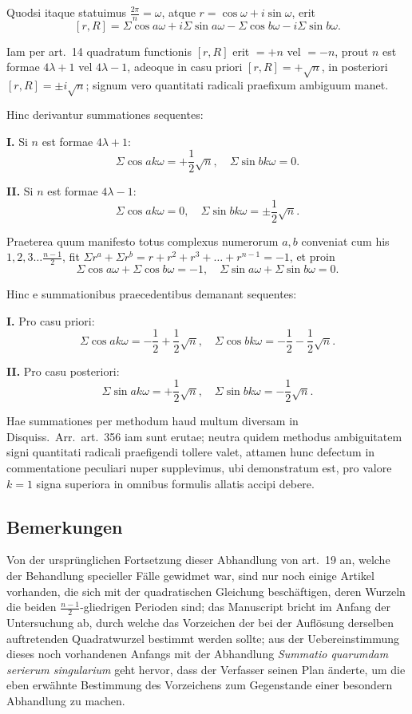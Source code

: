 \documentclass[12pt,a4paper]{article}
\begin{document}
Quodsi itaque statuimus $\frac{2\pi}{n} = \omega$, atque $r = \cos\omega + i\sin\omega$, erit
\[
[r,R] = \Sigma\cos a\omega + i\Sigma\sin a\omega - \Sigma\cos b\omega - i\Sigma\sin b\omega.
\]

Iam per art.\ 14 quadratum functionis $[r,R]$ erit $=+n$ vel $=-n$, prout $n$ est formae $4\lambda+1$ vel $4\lambda-1$, adeoque in casu priori $[r,R] = +\sqrt{n}$, in posteriori $[r,R] = \pm i\sqrt{n}$; signum vero quantitati radicali praefixum ambiguum manet.

Hinc derivantur summationes sequentes:

\textbf{I.} Si $n$ est formae $4\lambda+1$:
\[
\Sigma\cos ak\omega = +\frac{1}{2}\sqrt{n}, \quad \Sigma\sin bk\omega = 0.
\]

\textbf{II.} Si $n$ est formae $4\lambda-1$:
\[
\Sigma\cos ak\omega = 0, \quad \Sigma\sin bk\omega = \pm\frac{1}{2}\sqrt{n}.
\]

Praeterea quum manifesto totus complexus numerorum $a, b$ conveniat cum his $1, 2, 3\ldots\frac{n-1}{2}$, fit $\Sigma r^a + \Sigma r^b = r + r^2 + r^3 + \ldots + r^{n-1} = -1$, et proin
\[
\Sigma\cos a\omega + \Sigma\cos b\omega = -1, \quad \Sigma\sin a\omega + \Sigma\sin b\omega = 0.
\]

Hinc e summationibus praecedentibus demanant sequentes:

\textbf{I.} Pro casu priori:
\[
\Sigma\cos ak\omega = -\frac{1}{2} + \frac{1}{2}\sqrt{n}, \quad \Sigma\cos bk\omega = -\frac{1}{2} - \frac{1}{2}\sqrt{n}.
\]

\textbf{II.} Pro casu posteriori:
\[
\Sigma\sin ak\omega = +\frac{1}{2}\sqrt{n}, \quad \Sigma\sin bk\omega = -\frac{1}{2}\sqrt{n}.
\]

Hae summationes per methodum haud multum diversam in Disquiss.\ Arr.\ art.\ 356 iam sunt erutae; neutra quidem methodus ambiguitatem signi quantitati radicali praefigendi tollere valet, attamen hunc defectum in commentatione peculiari nuper supplevimus, ubi demonstratum est, pro valore $k=1$ signa superiora in omnibus formulis allatis accipi debere.

\subsection*{Bemerkungen}

Von der urspr\"unglichen Fortsetzung dieser Abhandlung von art.\ 19 an, welche der Behandlung specieller F\"alle gewidmet war, sind nur noch einige Artikel vorhanden, die sich mit der quadratischen Gleichung besch\"aftigen, deren Wurzeln die beiden $\frac{n-1}{2}$-gliedrigen Perioden sind; das Manuscript bricht im Anfang der Untersuchung ab, durch welche das Vorzeichen der bei der Aufl\"osung derselben auftretenden Quadratwurzel bestimmt werden sollte; aus der Uebereinstimmung dieses noch vorhandenen Anfangs mit der Abhandlung \textit{Summatio quarumdam serierum singularium} geht hervor, dass der Verfasser seinen Plan \"anderte, um die eben erw\"ahnte Bestimmung des Vorzeichens zum Gegenstande einer besondern Abhandlung zu machen.
\end{document}
